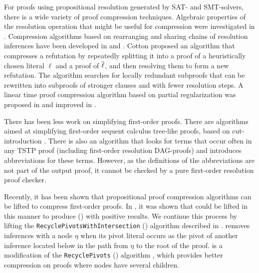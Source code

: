 \documentclass{llncs}
\begin{document}
For proofs using propositional resolution generated by SAT- and SMT-solvers, there is a wide variety of proof compression techniques. Algebraic properties of the resolution operation that might be useful for compression were investigated in \cite{bwp10}.
Compression algorithms based on rearranging and sharing chains of resolution inferences have been
developed in \cite{Amjad07} and \cite{Sinz}.  Cotton \cite{CottonSplit} proposed an algorithm that
compresses a refutation by repeatedly splitting it into a proof of a heuristically chosen literal $\ell$
and a proof of $\overline{\ell}$, and then resolving them to form a new refutation.  The {\ReduceReconstruct} algorithm \cite{RedRec} searches for locally redundant
subproofs that can be rewritten into subproofs of stronger clauses and with fewer resolution steps.
A linear time proof compression algorithm based on partial
regularization was proposed in \cite{RP08} and improved in \cite{LURPI}. %


There has been less work on simplifying first-order proofs. There are algorithms aimed at simplifying first-order sequent calculus tree-like proofs, based on cut-introduction \cite{BrunoLPAR,Hetzl}. There is also an algorithm \cite{LPARCzech} that looks for terms that occur often in any TSTP \cite{TPTP} proof (including first-order resolution DAG-proofs) and introduces abbreviations for these terms. However, as the definitions of the abbreviations are not part of the output proof, it cannot be checked by a pure first-order resolution proof checker.

Recently, it has been shown that propositional proof compression algorithms can be lifted to compress first-order proofs. In \cite{}, it was shown that {\LowerUnits} could be lifted in this manner to produce {\SFOLowerUnits} ({\GFOLU}) with positive results. We continue this process by lifting the 
\texttt{RecyclePiv\-otsWithIntersection}
({\RPI}) algorithm described in \cite{}. {\RPI} removes inferences with a node $\eta$ when its pivot literal occurs as the pivot of another inference located below in the path from $\eta$ to the root of the proof. {\RPI} is a modification of the \texttt{RecyclePivots} ({\RP}) algorithm \cite{Bar-IlanFuhrmannHooryShachamStrichman2009Linear-time-reductions-of-resolution-proofs}, which  provides better compression on proofs where nodes have several children.
\end{document}
